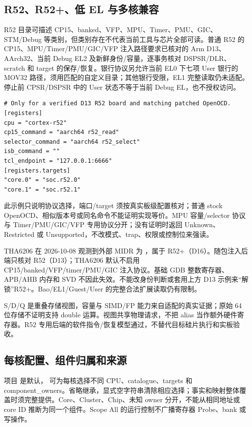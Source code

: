 \documentclass[UTF8,a4paper,11pt,oneside,fontset=none]{ctexart}
\newcommand{\code}[1]{\texttt{\detokenize{#1}}}
\newcommand{\notice}[1]{\par\noindent\colorbox{pale}{\parbox{\dimexpr\linewidth-2\fboxsep}{\small #1}}\par}
\begin{document}
\subsection{R52、R52+、低 EL 与多核兼容}
R52 目录可描述 CP15、banked、VFP、MPU、Timer、PMU、GIC、STM/Debug 等类别，但类别存在不代表当前工具与芯片全部可读。普通 R52 的 CP15、MPU/Timer/PMU/GIC/VFP 注入路径要求已核对的 Arm D13、AArch32、当前 Debug EL2 及新鲜身份/容量，逐事务核对 DSPSR/DLR、scratch 和 target 的保存/恢复。银行协议另允许当前 EL0 下七项 User 银行的 MOV32 路径，须用匹配的自定义目录；其他银行受限，EL1 完整读取仍未适配。停止前 CPSR/DSPSR 中的 User 状态不等于当前 Debug EL，也不授权访问。

\begin{lstlisting}
# Only for a verified D13 R52 board and matching patched OpenOCD.
[registers]
cpu = "cortex-r52"
cp15_command = "aarch64 r52_read"
selector_command = "aarch64 r52_select"
isb_command = ""
tcl_endpoint = "127.0.0.1:6666"
[registers.targets]
"core.0" = "soc.r52.0"
"core.1" = "soc.r52.1"
\end{lstlisting}
此示例只说明协议选择，端口/target 须按真实板级配置核对；普通 stock OpenOCD、相似版本号或同名命令不能证明实现等价。MPU 容量/selector 协议与 Timer/PMU/GIC/VFP 专用协议分开；没有证明时返回 Unknown、Restricted 或 Unsupported，不改模式、trap、权限或控制位来强读。

\notice{THA6206 在 2026-10-08 观测到外部 MIDR 为 \code{0x410FD161}，属于 R52+（D16）。随包注入后端只核对 R52（D13）；THA6206 默认不启用 CP15/banked/VFP/timer/PMU/GIC 注入协议。基础 GDB 整数寄存器、APB/AHB 内存和 SVD 不因此失效。不能改身份判断或套用上方 D13 示例来“解锁”R52+。Bao/EL1/Guest/User 的完整合法扩展读取仍有限制。}

S/D/Q 是重叠存储视图，容量与 SIMD/FP 能力来自适配的真实证据；原始 64 位存储不证明支持 double 运算。视图共享物理请求，不把 alias 当作额外硬件寄存器。R52 专用后端的软件指令/恢复模型通过，不替代目标硅片执行和实板验收。

\subsection{每核配置、组件归属和来源}
项目 \code{[registers]} 是默认，\code{[cores.registers]} 可为每核选择不同 CPU、catalogue、targets 和 component\_owners。省略继承，显式空字符串清除相应选择；事实和映射整体覆盖时须完整提供。Core、Cluster、Chip、未知 owner 分开，不能从相同地址或 core ID 推断为同一个组件。Scope All 的运行控制不广播寄存器 Probe、bank 或写操作。
\end{document}
